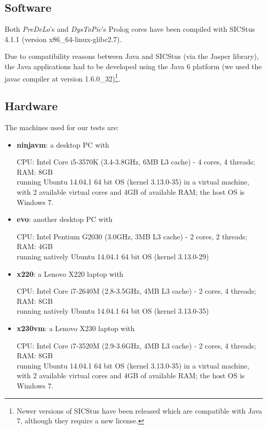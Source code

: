 \documentclass[a4paper, 11pt, oneside]{duthesis}
\begin{document}
\subsection{Software}

Both \emph{PreDeLo}'s and \emph{DysToPic}'s Prolog cores have been compiled with SICStus 4.1.1 (version x86\_64-linux-glibc2.7).

Due to compatibility reasons between Java and SICStus (via the Jasper library), the Java applications had to be developed using the Java 6 platform (we used the javac compiler at version 1.6.0\_32)\footnote{Newer versions of SICStus have been released which are compatible with Java 7, although they require a new license.}.



\newpage

\subsection{Hardware}\label{hardware}
The machines used for our tests are:

\begin{itemize}

\item \textbf{ninjavm}: a desktop PC with 

CPU: Intel Core i5-3570K (3.4-3.8GHz, 6MB L3 cache) - 4 cores, 4 threads;\\
RAM: 8GB\\
running Ubuntu 14.04.1 64 bit OS (kernel 3.13.0-35) in a virtual machine, with 2 available virtual cores and 4GB of available RAM; the host OS is Windows 7.

\item \textbf{evo}: another desktop PC with

CPU: Intel Pentium G2030 (3.0GHz, 3MB L3 cache) - 2 cores, 2 threads;\\
RAM: 4GB\\
running natively Ubuntu 14.04.1 64 bit OS (kernel 3.13.0-29)

\item \textbf{x220}: a Lenovo X220 laptop with

CPU: Intel Core i7-2640M (2.8-3.5GHz, 4MB L3 cache) - 2 cores, 4 threads;\\
RAM: 8GB\\
running natively Ubuntu 14.04.1 64 bit OS (kernel 3.13.0-35)


\item \textbf{x230vm}: a Lenovo X230 laptop with

CPU: Intel Core i7-3520M (2.9-3.6GHz, 4MB L3 cache) - 2 cores, 4 threads;\\
RAM: 8GB\\
running Ubuntu 14.04.1 64 bit OS (kernel 3.13.0-35) in a virtual machine, with 2 available virtual cores and 4GB of available RAM; the host OS is Windows 7.

\end{itemize}
\end{document}
